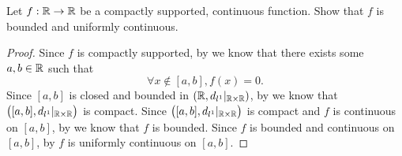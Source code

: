 \begin{ex}\label{ii:ex:3.8.3}
  Let \(f : \mathbb{R} \to \mathbb{R}\) be a compactly supported, continuous function.
  Show that \(f\) is bounded and uniformly continuous.
\end{ex}

\begin{proof}
  Since \(f\) is compactly supported, by  we know that there exists some \(a, b \in \mathbb{R}\) such that
  \[
    \forall x \notin [a, b], f(x) = 0.
  \]
  Since \([a, b]\) is closed and bounded in \((\mathbb{R}, d_{l^1}|_{\mathbb{R} \times \mathbb{R}})\), by  we know that \(\big([a, b], d_{l^1}|_{\mathbb{R} \times \mathbb{R}}\big)\) is compact.
  Since \(\big([a, b], d_{l^1}|_{\mathbb{R} \times \mathbb{R}}\big)\) is compact and \(f\) is continuous on \([a, b]\), by  we know that \(f\) is bounded.
  Since \(f\) is bounded and continuous on \([a, b]\), by  \(f\) is uniformly continuous on \([a, b]\).


\end{proof}
